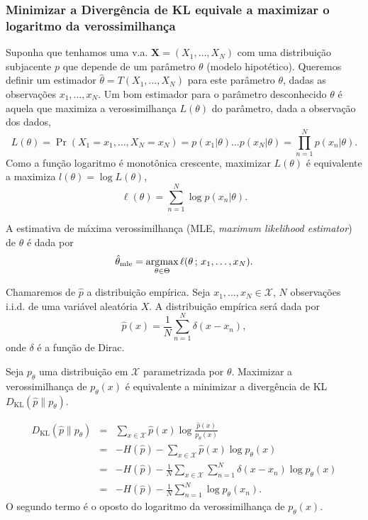 \begin{frame}[allowframebreaks]
  \frametitle{Minimizar a Divergência de KL equivale a maximizar o logaritmo da verossimilhança}
  Suponha que tenhamos uma v.a. $\mathbf{X}=(X_1,\ldots,X_N)$ com uma distribuição subjacente $p$
  que depende de um parâmetro $\theta$ (modelo hipotético). Queremos definir um estimador 
  $\hat{\theta} = T(X_1, \ldots, X_N)$ para este parâmetro $\theta$, dadas as observações $x_1, \ldots, x_N$.
  Um bom estimador para o parâmetro desconhecido $\theta$ é aquela que maximiza a verossimilhança $L(\theta)$ 
  do parâmetro, dada a observação dos dados,
  \begin{equation}
  L(\theta) = \Pr(X_1=x_1, \ldots, X_N=x_N) = p(x_1|\theta) \ldots p(x_N|\theta) = \prod_{n=1}^{N} p(x_n|\theta) .
  \end{equation}
  Como a função logaritmo é monotônica crescente, maximizar $L(\theta)$ é equivalente a maximiza $l(\theta) = \log L(\theta)$,
  \begin{equation} 
  \ell(\theta) = \sum_{n=1}^{N} \log p(x_n|\theta) .
  \end{equation}

  A estimativa de máxima verossimilhança (MLE, \textit{maximum likelihood estimator}) de $\theta$ é dada por
  \begin{equation}
  \hat\theta_\mathrm{mle} = \operatorname*{\arg\!\max}_{\theta\in\Theta} \ell(\theta\,;\,x_1,\ldots,x_N) .
  \end{equation}

  \framebreak

  Chamaremos de $\hat{p}$ a distribuição empírica. Seja $x_1, \ldots, x_N \in \mathcal{X}$, $N$ observações
  i.i.d. de uma variável aleatória $X$. A distribuição empírica será dada por
  \begin{equation}
  \hat{p}(x) = \frac{1}{N} \sum_{n=1}^{N} \delta(x - x_n) ,
  \end{equation}
  onde $\delta$ é a função de Dirac.

  \vspace{3em}
  Seja $p_\theta$ uma distribuição em $\mathcal{X}$ parametrizada por $\theta$. 
  Maximizar a verossimilhança de $p_\theta(x)$ é equivalente a minimizar a divergência de KL 
  $D_\mathrm{KL}(\hat{p} \parallel p_\theta)$.

  \framebreak

  \begin{eqnarray}
  D_\mathrm{KL}(\hat{p} \parallel p_\theta) &=& \sum_{x \in \mathcal{X}} \hat{p}(x) \log \frac{\hat{p}(x)}{p_\theta(x)} \nonumber \\
        &=& -H(\hat{p}) - \sum_{x \in \mathcal{X}} \hat{p}(x) \log p_\theta(x)  \nonumber \\
        &=& -H(\hat{p}) - \frac{1}{N} \sum_{x \in \mathcal{X}} \sum_{n=1}^{N} \delta(x - x_n) \log p_\theta(x) \nonumber \\
        &=& -H(\hat{p}) - \frac{1}{N} \sum_{n=1}^{N} \log p_\theta(x_n) .
  \end{eqnarray}
  O segundo termo é o oposto do logaritmo da verossimilhança de $p_\theta(x)$.
  

\end{frame}

